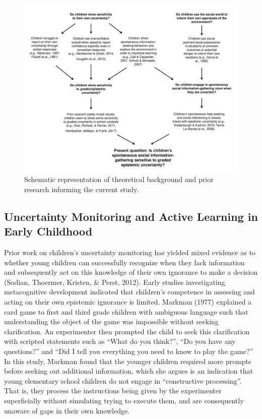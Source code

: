 \documentclass[floatsintext,man]{apa6}
\theoremstyle{definition}
\theoremstyle{definition}
\theoremstyle{definition}
\theoremstyle{remark}
\begin{document}
\begin{figure}

{\centering \includegraphics{../images/diagram_lit_review} 

}

\caption{Schematic representation of theoretical background and prior research informing the current study.}\label{fig:schematic}
\end{figure}

\subsection{Uncertainty Monitoring and Active Learning in Early
Childhood}\label{uncertainty-monitoring-and-active-learning-in-early-childhood}

Prior work on children's uncertainty monitoring has yielded mixed
evidence as to whether young children can successfully recognize when
they lack information and subsequently act on this knowledge of their
own ignorance to make a decision (Sodian, Thoermer, Kristen, \& Perst,
2012). Early studies investigating metacognitive development indicated
that children's competence in assessing and acting on their own
epistemic ignorance is limited. Markman (1977) explained a card game to
first and third grade children with ambiguous language such that
understanding the object of the game was impossible without seeking
clarification. An experimenter then prompted the child to seek this
clarification with scripted statements such as \enquote{What do you
think?}, \enquote{Do you have any questions?} and \enquote{Did I tell
you everything you need to know to play the game?} In this study,
Markman found that the younger children required more prompts before
seeking out additional information, which she argues is an indication
that young elementary school children do not engage in
\enquote{constructive processing}. That is, they process the
instructions being given by the experimenter superficially without
simulating trying to execute them, and are consequently unaware of gaps
in their own knowledge.
\end{document}
